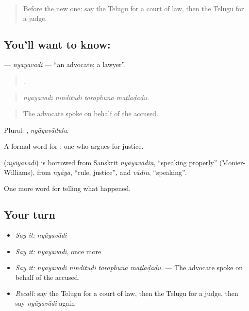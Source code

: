\label{lesson:TE-C349-nyayavadi}



\begin{quote}
Before the new one: say the Telugu for a court of law, then the Telugu for a judge.
\end{quote}

\subsection*{You'll want to know: }
\textbf{} — \emph{nyāyavādi} — \textquotedblleft{}an advocate; a lawyer\textquotedblright{}.

\begin{quote}
   .
\end{quote}

\begin{quote}
\emph{nyāyavādi nindituḍi taraphuna māṭlāḍāḍu.}
\end{quote}

\begin{quote}
The advocate spoke on behalf of the accused.
\end{quote}

Plural: , \emph{nyāyavādulu}.

A formal word for : one who argues for justice.

\begin{cousinweb}
\textbf{} (\emph{nyāyavādi}) is borrowed from Sanskrit \emph{nyāyavādin}, \textquotedblleft{}speaking properly\textquotedblright{} (Monier-Williams), from \emph{nyāya}, \textquotedblleft{}rule, justice\textquotedblright{}, and \emph{vādin}, \textquotedblleft{}speaking\textquotedblright{}.
\end{cousinweb}

\begin{grammarlens}[title={What you've built}]
One more word for telling what happened.
\end{grammarlens}

\subsection*{Your turn}
\begin{itemize}
\raggedright
  \item \emph{Say it:} \emph{nyāyavādi}
  \item \emph{Say it:} \emph{nyāyavādi}, once more
  \item \emph{Say it:} \emph{nyāyavādi nindituḍi taraphuna māṭlāḍāḍu.} — The advocate spoke on behalf of the accused.
  \item \emph{Recall:} say the Telugu for a court of law, then the Telugu for a judge, then say \emph{nyāyavādi} again
\end{itemize}

